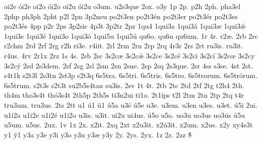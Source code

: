 {oi2e
ói2e
oi2o
ói2o
oi2u
ói2u
o3um.
u2s3que
2ox.
o3y
1p
2p.
p2h
2ph.
pha3el
2php
ph3ph
2pht
p2l
2pn
3p2neu
po2t3en
po2t3én
po2t3er
po2t3ér
po2t3es
po2t3és
4pp
p2r
2ps
3p2sic
4p3t
3p2tr
2pz
1qu4
1qui3a
1qui3á
1qui3æ
1qui3ǽ
1qui3e
1qui3é
1qui3o
1qui3ó
1qui5u
1qui5ú
qu6o.
qu6u
qu6um.
1r
4r.
r2æ.
2rb
2rc
r2chm
2rd
2rf
2rg
r2h
ri3e.
r4iit.
2rl
2rm
2rn
2rp
2rq
4r3r
2rs
2rt
ru3is.
ru3it.
r4us.
4rv
2r1x
2rz
1s
4s.
2sb
2sc
3s2cæ
3s2cǽ
3s2ce
3s2cé
3s2ci
3s2cí
3s2cœ
3s2cy
3s2cý
2sd
2s3dem.
2sf
2sg
2sl
2sm
2sn
2sne.
2sp
2sq
2s3que.
2sr
4ss
s3se.
4st
2st.
s4t1k
s2t3l
2s3tn
2st3p
s2t3q
6s5tra.
6s5tri.
6s5tris.
6s5tro.
6s5trorum.
6s5trórum.
6s5trum.
s2t3s
s2t3t
su2b5s4tan
su3is.
2sv
1t
4t.
2tb
2tc
2td
2tf
2tg
t2h4
2th.
th4m
tho3s4t
thó3s4t
2th5p
2th5s
ti3n2ui
ti1o.
2t1íps
t2l
2tm
2tn
2tp
2tq
t4r
tru3um.
tru3us.
2ts
2tt
u1
ú1
ü1
ú5a
u3é
ú5e
u3e.
u3em.
u3en
u3es.
u3et.
ú5i
2ui.
u1i2a
u1i2e
u1i2é
u1i2o
u3is.
u3it.
ui2u
ui4us.
ú5o
u5o.
uo3u
uo3us
uo3ús
ú5u
u5um.
u5us.
2ux.
1v
1x
2x.
x2it.
2xq
2xt
x2u3it.
x2ú3it.
x2um.
x2us.
x2y
xy4s3t
y1
ý1
y3a
y3e
y3i
y3o
y3u
y3æ
y3y
2y.
2ys.
2yx.
1z
2z.
2zz
8́
}
